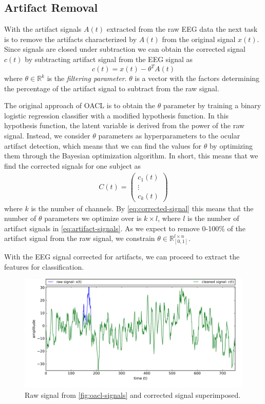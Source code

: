 \subsection{Artifact Removal}
With the artifact signals $A(t)$ extracted from the raw EEG data the next task is to remove the artifacts characterized by $A(t)$ from the original signal $x(t)$. Since signals are closed under subtraction we can obtain the corrected signal $c(t)$ by subtracting artifact signal from the EEG signal as
\begin{equation}\label{eq:corrected-signal}
c(t) = x(t) - \theta^T A(t)
\end{equation}
where $\theta \in \mathbb{R}^{k}$ is the \emph{filtering parameter}. $\theta$ is a vector with the factors determining the percentage of the artifact signal to subtract from the raw signal. 

The original approach of OACL is to obtain the $\theta$ parameter by training a binary logistic regression classifier with a modified hypothesis function. In this hypothesis function, the latent variable is derived from the power of the raw signal. Instead, we consider $\theta$ parameters as hyperparameters to the ocular artifact detection, which means that we can find the values for $\theta$ by optimizing them through the Bayesian optimization algorithm. In short, this means that we find the corrected signals for one subject as
\begin{align}\label{eq:corrected-signal}
C(t)=  \begin{pmatrix}
c_1(t) \\
\vdots  \\
c_{k}(t) 
\end{pmatrix}
\end{align}
where $k$ is the number of channels. By \cref{eq:corrected-signal} this means that the number of $\theta$ parameters we optimize over is $k \times l$, where $l$ is the number of artifact signals in \cref{eq:artifact-signals}. As we expect to remove 0-100\% of the artifact signal from the raw signal, we constrain $\theta \in \mathbb{R}^{l\times n}_{[0,1]}$.

With the EEG signal corrected for artifacts, we can proceed to extract the features for classification.
\begin{figure}%
	\centering
	\includegraphics[width=1\textwidth]{figures/cleaned-oacl-signal.png}
	\vspace{-2em}
	\caption{Raw signal from \cref{fig:oacl-signals} and corrected signal superimposed.}
	\label{fig:cleaned-oacl-signals}
\end{figure}